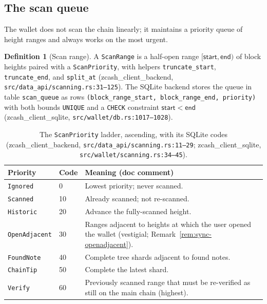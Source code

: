 \documentclass[11pt,a4paper]{article}
\theoremstyle{definition}
\newtheorem{definition}[theorem]{Definition}
\begin{document}
\subsection{The scan queue}\label{sec:sync-queue}

The wallet does not scan the chain linearly; it maintains a priority queue
of height ranges and always works on the most urgent.

\begin{definition}[Scan range]\label{def:sync-scanrange}
A \texttt{ScanRange} is a half-open range $[\mathsf{start}, \mathsf{end})$
of block heights paired with a \texttt{ScanPriority}, with helpers
\texttt{truncate\_start}, \texttt{truncate\_end}, and \texttt{split\_at}
(\textsf{zcash\_client\_backend}, \texttt{src/data\_api/scanning.rs:31--125}).
The
SQLite backend stores the queue in table \texttt{scan\_queue} as rows
\texttt{(block\_range\_start, block\_range\_end, priority)} with both
bounds \texttt{UNIQUE} and a \texttt{CHECK} constraint
$\mathsf{start} < \mathsf{end}$
(\textsf{zcash\_client\_sqlite}, \texttt{src/wallet/db.rs:1017--1028}).
\end{definition}

\begin{table}[htbp]
\centering
\begin{tabular}{@{}llp{8.2cm}@{}}
\toprule
Priority & Code & Meaning (doc comment) \\
\midrule
\texttt{Ignored}      & 0  & Lowest priority; never scanned. \\
\texttt{Scanned}      & 10 & Already scanned; not re-scanned. \\
\texttt{Historic}     & 20 & Advance the fully-scanned height. \\
\texttt{OpenAdjacent} & 30 & Ranges adjacent to heights at which the user
                             opened the wallet (vestigial;
                             Remark~\ref{rem:sync-openadjacent}). \\
\texttt{FoundNote}    & 40 & Complete tree shards adjacent to found notes. \\
\texttt{ChainTip}     & 50 & Complete the latest shard. \\
\texttt{Verify}       & 60 & Previously scanned range that must be
                             re-verified as still on the main chain
                             (highest). \\
\bottomrule
\end{tabular}
\caption{The \texttt{ScanPriority} ladder, ascending, with its SQLite codes
(\textsf{zcash\_client\_backend}, \texttt{src/data\_api/scanning.rs:11--29};
\textsf{zcash\_client\_sqlite}, \texttt{src/wallet/scanning.rs:34--45}).}
\label{tab:sync-priorities}
\end{table}
\end{document}
